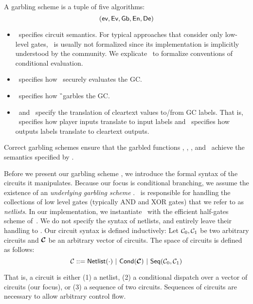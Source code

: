 A garbling scheme is a tuple of five algorithms:
\[ (\textsf{ev}, \textsf{Ev}, \textsf{Gb}, \textsf{En}, \textsf{De}) \]
%
\begin{itemize}
  \item \gev\ specifies circuit semantics. For typical approaches that
    consider only low-level gates, \gev\ is usually not formalized since its
    implementation is implicitly understood by the community. We explicate \gev\ to formalize
    conventions of conditional evaluation.
  \item \gEv\ specifies how \E\ securely evaluates the GC.
  \item \gGb\ specifies how \G\ garbles the GC.
  \item \gEn\ and \gDe\ specify the translation of cleartext values
    to/from GC labels. That is, \gEn\ specifies how player
    inputs translate to input labels and \gDe\ specifies how outputs
    labels translate to cleartext outputs.
\end{itemize}
%
Correct garbling schemes ensure that the garbled functions \gGb, \gEn,
\gEv, and \gDe\ achieve the semantics specified by \gev.

Before we present our garbling scheme \ourschemelong, we introduce the
formal syntax of the circuits it manipulates.
Because our focus is conditional branching, we assume the existence of
an \emph{underlying garbling scheme} \underscheme.
\underscheme\ is responsible for handling the collections of low level
gates (typically AND and XOR gates) that we refer to as \emph{netlists}.
In our implementation, we instantiate \underscheme\ with the efficient
half-gates scheme of~\cite{EC:ZahRosEva15}.
We do not specify the syntax of netlists, and entirely leave their
handling to \underscheme.
Our circuit syntax is defined inductively:
Let $\mathcal C_0, \mathcal C_1$ be two arbitrary circuits and $\vec \cir$ be an
arbitrary vector of circuits. The space of
circuits is defined as follows:
\[
  \cir ::= \netlist(\cdot)~|~%
  \conditional(\vec \cir)~|~%
  \sequential(\cir_0, \cir_1)
\]

That is, a circuit is either (1) a netlist, (2) a conditional dispatch
over a vector of circuits (our focus), or (3) a sequence of two
circuits.
Sequences of circuits are necessary to allow arbitrary
control flow.


